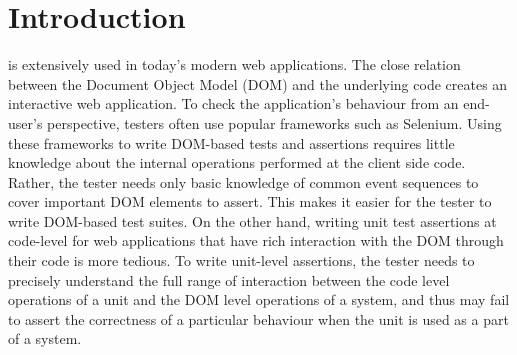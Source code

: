 \section{Introduction} \label{Sec:intro}
\javascript is extensively used in today's modern web applications. The close relation between the Document Object Model (DOM) and the underlying \javascript code creates an interactive web application. To check the application's behaviour from an end-user's perspective, testers often use popular frameworks such as Selenium. Using these frameworks to write DOM-based tests and assertions
requires little knowledge about the internal operations performed at the client side code. Rather, the tester needs only basic knowledge of common event sequences to cover important DOM elements to assert. 
This makes it easier for the tester to write DOM-based test suites. On the other hand,
writing unit test assertions at code-level for web applications that have rich interaction with the DOM through their \javascript code is more tedious. 
To write unit-level assertions, the tester needs to precisely understand the full range of interaction between the code level operations of a unit and the DOM level operations of a system, and thus may fail to assert the correctness of a particular behaviour when the unit is used as a part of a system. 

